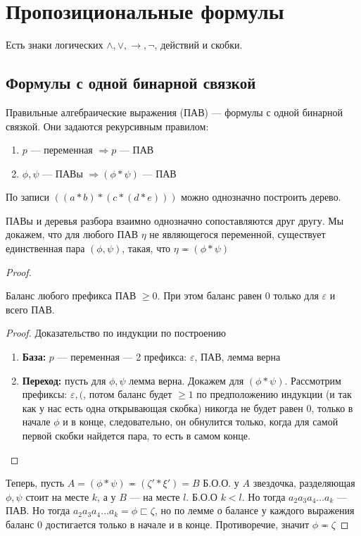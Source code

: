 
\section{Пропозициональные формулы}
Есть знаки логических $\wedge, \vee, \rightarrow, \neg$, действий и скобки.
\subsection{Формулы с одной бинарной связкой}
\begin{definition}
    Правильные алгебраические выражения (ПАВ) --- формулы с одной бинарной связкой. Они задаются рекурсивным правилом:
\begin{enumerate}
    \item $p$ --- переменная $\Rightarrow p$ --- ПАВ
    \item $\phi, \psi$ --- ПАВы $\Rightarrow (\phi * \psi)$ --- ПАВ
\end{enumerate}
По записи $((a*b)*(c*(d*e)))$ можно однозначно построить дерево.
\end{definition}

\begin{theorem}
    ПАВы и деревья разбора взаимно однозначно сопоставляются друг другу. Мы докажем, что для любого ПАВ $\eta$ не являющегося переменной, существует единственная пара $(\phi, \psi)$, такая, что $\eta \eqcirc  (\phi * \psi)$
\end{theorem}
\begin{proof}
\begin{lemma}
    Баланс любого префикса ПАВ $\ge 0$. При этом баланс равен 0 только для $\varepsilon$ и всего ПАВ.
\end{lemma}
\begin{proof}
Доказательство по индукции по построению
    \begin{enumerate}
        \item[] \textbf{База:} $p$ --- переменная --- 2 префикса: $\varepsilon$, ПАВ, лемма верна 
        \item[] \textbf{Переход:} пусть для $\phi, \psi$ лемма верна. Докажем для $(\phi*\psi)$. Рассмотрим префиксы: $\varepsilon, ($, потом баланс будет $\ge 1$ по предположению индукции (и так как у нас есть одна открывающая скобка) никогда не будет равен 0, только в начале $\phi$ и в конце, следовательно, он обнулится только, когда для самой первой скобки найдется пара, то есть в самом конце.
    \end{enumerate}
\end{proof}
Теперь, пусть $A = (\phi*\psi) \eqcirc (\zeta'*\xi') = B$
Б.О.О. у $A$ звездочка, разделяющая $\phi, \psi$ стоит на месте $k$, а у  $B$ --- на месте $l$. Б.О.О $k < l$. Но тогда $a_2a_3a_4\dots a_k$ --- ПАВ. Но тогда $a_2a_3a_4\dots a_k = \phi \sqsubset \zeta$, но по лемме о балансе у каждого выражения баланс 0 достигается только в начале и в конце. Противоречие, значит $\phi \eqcirc \zeta$
\end{proof}
